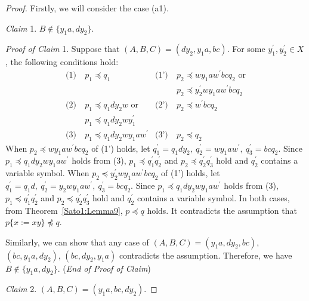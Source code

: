 \begin{proof}
  Firstly, we will consider the case (a1).

  \smallskip

  \noindent
  \textit{Claim} 1. $B \not\in \{y_{1}a, dy_{2}\}$.

  \smallskip
  \noindent
  \textit{Proof of Claim} 1.
  Suppose that $(A, B, C) = (dy_{2}, y_{1}a, bc)$. For some $y_{1}^{\prime},y_{2}^{\prime}\in X$, the following conditions hold:
  \begin{align*}
    \textrm{(1)}~& p_{1} \preceq q_{1} & \textrm{(1')}~& p_{2} \preceq wy_{1}aw^{\prime}bcq_{2}\mbox{ or} \\
    & & & p_{2} \preceq y_{2}^{\prime}wy_{1}aw^{\prime}bcq_{2}\\
    \textrm{(2)}~& p_{1} \preceq q_{1}dy_{2}w\mbox{ or}  & \textrm{(2')}~& p_{2} \preceq w^{\prime}bcq_{2}\\
    & p_{1} \preceq q_{1}dy_{2}wy_{1}^{\prime} & & \\
    \textrm{(3)}~& p_{1} \preceq q_{1}dy_{2}wy_{1}aw^{\prime} & \textrm{(3')}~& p_{2} \preceq q_{2}
  \end{align*}
  When $p_{2} \preceq wy_{1}aw^{\prime}bcq_{2}$ of (1') holds, let $q^{\prime}_{1}=q_{1}dy_{2},~q^{\prime}_{2}=wy_{1}aw^{\prime},~q^{\prime}_{3}=bcq_{2}$. Since $p_{1} \preceq q_{1}dy_{2}wy_{1}aw^{\prime}$ holds from (3), $p_{1} \preceq q^{\prime}_{1}q^{\prime}_{2}$ and $p_{2} \preceq q^{\prime}_{2}q^{\prime}_{3}$ hold and $q_{2}^{\prime}$ contains a variable symbol.
  When $p_{2} \preceq y_{2}^{\prime}wy_{1}aw^{\prime}bcq_{2}$ of (1') holds, let $q^{\prime}_{1}=q_{1}d,~q^{\prime}_{2}=y_{2}wy_{1}aw^{\prime},~q^{\prime}_{3}=bcq_{2}$. Since $p_{1} \preceq q_{1}dy_{2}wy_{1}aw^{\prime}$ holds from (3), $p_{1} \preceq q^{\prime}_{1}q^{\prime}_{2}$ and $p_{2} \preceq q^{\prime}_{2}q^{\prime}_{3}$ hold and $q_{2}^{\prime}$ contains a variable symbol.
  In both cases, from Theorem~\ref{Sato1:Lemma9}, $p \preceq q$ holds. It contradicts the assumption that $p \{ x := xy \} \not \preceq q$.

  Similarly, we can show that any case of $(A, B, C) = (y_{1}a, dy_{2}, bc)$, $(bc, y_{1}a, dy_{2})$, $(bc, dy_{2}, y_{1}a)$ contradicts the assumption.
  Therefore, we have $B \not\in \{y_{1}a, dy_{2}\}$. (\textit{End of Proof of Claim})

  \smallskip

  \noindent
  \textit{Claim} 2. $(A, B, C) = (y_{1}a, bc, dy_{2})$.


\end{proof}
